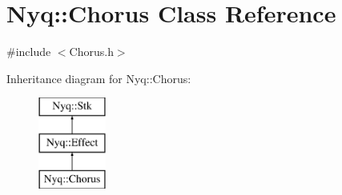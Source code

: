 \hypertarget{class_nyq_1_1_chorus}{}\section{Nyq\+:\+:Chorus Class Reference}
\label{class_nyq_1_1_chorus}


{\ttfamily \#include $<$Chorus.\+h$>$}

Inheritance diagram for Nyq\+:\+:Chorus\+:\begin{figure}[H]
\begin{center}
\leavevmode
\includegraphics[height=3.000000cm]{class_nyq_1_1_chorus}
\end{center}
\end{figure}

